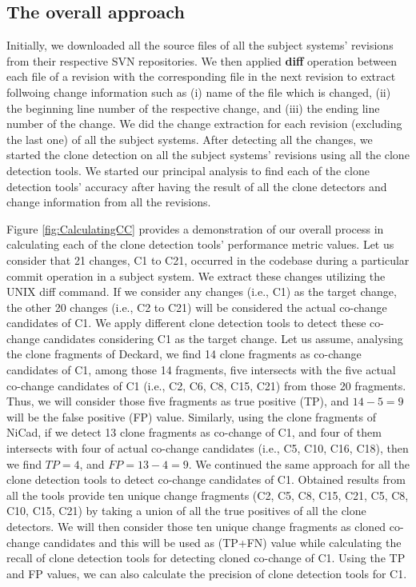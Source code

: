 \documentclass[review]{elsarticle}
\begin{document}
\subsection{The overall approach} 
Initially, we downloaded all the source files of all the subject systems' revisions from their respective SVN repositories. We then applied \textbf{diff} operation between each file of a revision with the corresponding file in the next revision to extract follwoing change information such as (i) name of the file which is changed, (ii) the beginning line number of the respective change, and (iii) the ending line number of the change. We did the change extraction for each revision (excluding the last one) of all the subject systems. After detecting all the changes, we started the clone detection on all the subject systems' revisions using all the clone detection tools. We started our principal analysis to find each of the clone detection tools' accuracy after having the result of all the clone detectors and change information from all the revisions. 

Figure \ref{fig:CalculatingCC} provides a demonstration of our overall process in calculating each of the clone detection tools' performance metric values. Let us consider that 21 changes, C1 to C21, occurred in the codebase during a particular commit operation in a subject system. We extract these changes utilizing the UNIX diff command. If we consider any changes (i.e., C1) as the target change, the other 20 changes (i.e., C2 to C21) will be considered the actual co-change candidates of C1.  We apply different clone detection tools to detect these co-change candidates considering C1 as the target change. Let us assume, analysing the clone fragments of Deckard, we find 14 clone fragments as co-change candidates of C1, among those 14 fragments, five intersects with the five actual co-change candidates of C1 (i.e., C2, C6, C8, C15, C21) from those 20 fragments. Thus, we will consider those five fragments as true positive (TP), and $14-5=9$ will be the false positive (FP) value. Similarly, using the clone fragments of NiCad, if we detect 13 clone fragments as co-change of C1, and four of them intersects with four of actual co-change candidates (i.e., C5, C10, C16, C18), then we find $TP=4$, and $FP=13-4=9$. We continued the same approach for all the clone detection tools to detect co-change candidates of C1. Obtained results from all the tools provide ten unique change fragments (C2, C5, C8, C15, C21, C5, C8, C10, C15, C21) by taking a union of all the true positives of all the clone detectors. We will then consider those ten unique change fragments as cloned co-change candidates and this will be used as (TP+FN) value while calculating the recall of clone detection tools for detecting cloned co-change of C1.  Using the TP and FP values, we can also calculate the precision of clone detection tools for C1.  
\end{document}
